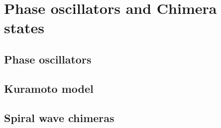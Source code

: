 \section{Phase oscillators and Chimera states}
\subsection{Phase oscillators}

\subsection{Kuramoto model}

\subsection{Spiral wave chimeras}